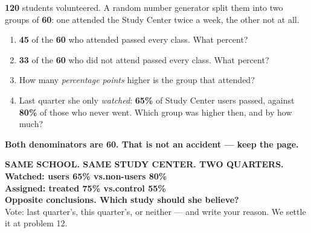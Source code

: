 \documentclass[aspectratio=169, 11pt]{beamer}
\begin{document}
\begin{frame}[t, plain]
  \vspace{0.2cm}
  \begin{center}
    \begin{minipage}{0.88\textwidth}
      \textbf{120} students volunteered. A random number generator split them into two groups
      of \textbf{60}: one attended the Study Center twice a week, the other not at all.
      \begin{enumerate}\setlength{\itemsep}{6pt}
        \item \textbf{45} of the \textbf{60} who attended passed every class. What percent?
        \item \textbf{33} of the \textbf{60} who did not attend passed every class. What percent?
        \item[3(a).] How many \emph{percentage points} higher is the group that attended?
        \item[3(b).] Last quarter she only \emph{watched}: \textbf{65\%} of Study Center users
              passed, against \textbf{80\%} of those who never went. Which group was higher
              then, and by how much?
      \end{enumerate}
    \end{minipage}
  \end{center}
  \vspace{0.3cm}
  \begin{center}
    {\color{cerulean}\bfseries Both denominators are 60. That is not an accident --- keep the page.}
  \end{center}
\end{frame}

{
\begin{frame}[plain]
  \vspace{1.1cm}
  \begin{center}
    {\color{frostmid}\bfseries\small SAME SCHOOL. SAME STUDY CENTER. TWO QUARTERS.}\\[0.7cm]
    {\color{white}\bfseries\Large Watched: users 65\% \quad vs.\quad non-users 80\%}\\[0.35cm]
    {\color{white}\bfseries\Large Assigned: treated 75\% \quad vs.\quad control 55\%}\\[0.8cm]
    {\color{goldacc}\bfseries\large Opposite conclusions. Which study should she believe?}\\[0.45cm]
    {\color{frostmid}\small Vote: last quarter's, this quarter's, or neither --- and write your
    reason. We settle it at problem 12.}
  \end{center}
\end{frame}
}
\end{document}
